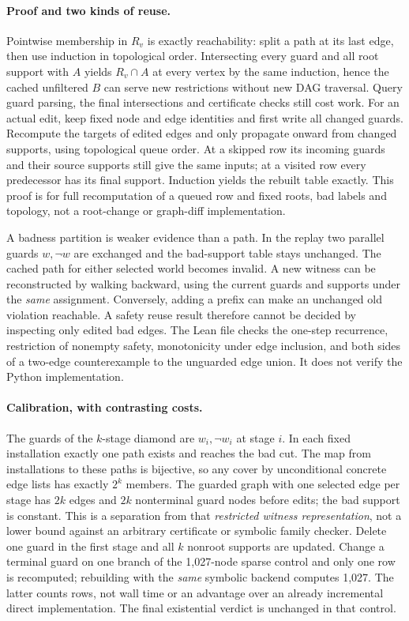 \documentclass[11pt]{article}
\begin{document}
\paragraph{Proof and two kinds of reuse.}
Pointwise membership in $R_v$ is exactly reachability: split a path at its
last edge, then use induction in topological order. Intersecting every guard
and all root support with $A$ yields $R_v\cap A$ at every vertex by the same
induction, hence the cached unfiltered $B$ can serve new restrictions without
new DAG traversal. Query guard parsing, the final intersections and
certificate checks still cost work. For an actual edit, keep fixed node and
edge identities and first write all changed guards. Recompute the targets
of edited edges and only propagate onward from changed supports, using
topological queue order. At a skipped row its incoming guards and their
source supports still give the same inputs; at a visited row every predecessor
has its final support. Induction yields the rebuilt table exactly. This
proof is for full recomputation of a queued row and fixed roots, bad labels
and topology, not a root-change or graph-diff implementation.

A badness partition is weaker evidence than a path. In the replay two
parallel guards $w,\neg w$ are exchanged and the bad-support table stays
unchanged. The cached path for either selected world becomes invalid. A new
witness can be reconstructed by walking backward, using the current guards
and supports under the \emph{same} assignment. Conversely, adding a
prefix can make an unchanged old violation reachable. A safety reuse result
therefore cannot be decided by inspecting only edited bad edges.
The Lean file checks the one-step recurrence, restriction of nonempty
safety, monotonicity under edge inclusion, and both sides of a two-edge
counterexample to the unguarded edge union. It does not verify the Python
implementation.

\paragraph{Calibration, with contrasting costs.}
The guards of the $k$-stage diamond are $w_i,\neg w_i$ at stage $i$.
In each fixed installation exactly one path exists and reaches the bad cut.
The map from installations to these paths is bijective, so any cover by
unconditional concrete edge lists has exactly $2^k$ members. The guarded graph
with one selected edge per stage has $2k$ edges and $2k$ nonterminal guard
nodes before edits; the bad support is constant. This is a separation from
that \emph{restricted witness representation}, not a lower bound against an
arbitrary certificate or symbolic family checker. Delete one guard in the
first stage and all $k$ nonroot supports are updated. Change a terminal guard
on one branch of the 1,027-node sparse control and only one row is recomputed;
rebuilding with the \emph{same} symbolic backend computes 1,027. The latter
counts rows, not wall time or an advantage over an already incremental direct
implementation. The final existential verdict is unchanged in that control.
\end{document}
